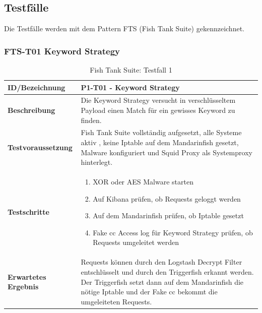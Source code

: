 \subsection{Testfälle}
Die Testfälle werden mit dem Pattern FTS (Fish Tank Suite) gekennzeichnet.

\begin{table}[H]
	\subsubsection{FTS-T01 Keyword Strategy}
    \centering
	\begin{tabularx}{\textwidth}{| l | p{} |}
        \hline
        \textbf{ID/Bezeichnung} & P1-T01 - Keyword Strategy\\ \hline
        \textbf{Beschreibung} &  Die Keyword Strategy versucht in verschlüsseltem Payload einen Match für ein gewisses Keyword zu finden.\\ \hline  
        \textbf{Testvoraussetzung} &  Fish Tank Suite vollständig aufgesetzt, alle Systeme aktiv , keine Iptable auf dem Mandarinfish gesetzt, Malware konfiguriert und Squid Proxy als Systemproxy hinterlegt.\\ \hline      
        \textbf{Testschritte} & 
        \begin{enumerate}
        	\item XOR oder AES Malware starten
        	\item Auf Kibana prüfen, ob Requests geloggt werden
        	\item Auf dem Mandarinfish prüfen, ob Iptable gesetzt
        	\item Fake \gls{cc} Access log für Keyword Strategy prüfen, ob Requests umgeleitet werden
        \end{enumerate} \\ \hline    
        \textbf{Erwartetes Ergebnis} &  Requests können durch den Logstash Decrypt Filter entschlüsselt und durch den Triggerfish erkannt werden. Der Triggerfish setzt dann auf dem Mandarinfish die nötige Iptable und der Fake \gls{cc} bekommt die umgeleiteten Requests.\\ \hline      
    \end{tabularx}
    \caption{Fish Tank Suite: Testfall 1}
\end{table}



